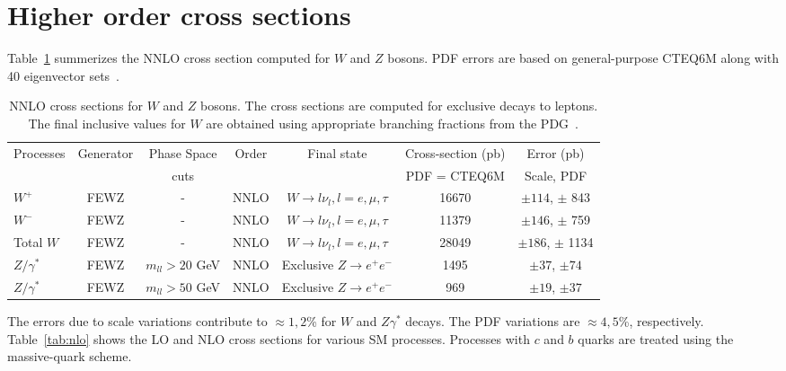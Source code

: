 \section{Higher order cross sections}
\label{sec:results}

Table~\ref{tab:nnlo} summerizes the NNLO cross section computed for $W$ and $Z$ bosons. 
PDF errors are based on general-purpose CTEQ6M along with 40 eigenvector sets~\cite{cteq6m}.

\vspace{3mm}
\begin{table}[hbt]
\begin{center}
\renewcommand{\arraystretch}{1.2}
\begin{tabular}{|l|c|c|c|c|c|c|}\hline
Processes & Generator & Phase Space& Order & Final state & Cross-section (pb)& Error (pb) \\ 
 &  &  cuts & & & PDF = CTEQ6M & Scale, PDF \\ \hline
$W^+$ & FEWZ & - & NNLO & $W \rightarrow l \nu_l, l=e,\mu,\tau$ & 16670 & $\pm 114$, $\pm$ 843 \\ \hline
$W^-$ & FEWZ & - & NNLO & $W \rightarrow l \nu_l, l=e,\mu,\tau$ & 11379 & $\pm 146$, $\pm$ 759 \\ \hline
Total $W$ & FEWZ & - & NNLO & $W \rightarrow l \nu_l, l=e,\mu,\tau$ & 28049 & $\pm 186$, $\pm$ 1134 \\ \hline
$Z/\gamma^*$ & FEWZ & $m_{ll} > 20$ GeV & NNLO & Exclusive $Z \rightarrow e^+e^-$ & 1495 & $\pm 37$, $\pm 74$ \\ \hline
$Z/\gamma^*$ & FEWZ & $m_{ll} > 50$ GeV & NNLO & Exclusive $Z \rightarrow e^+e^-$ & 969 & $\pm 19$, $\pm 37$ \\ \hline
\end{tabular} 
\caption{NNLO cross sections for $W$ and $Z$ bosons. The cross sections are computed for
exclusive decays to leptons. The final inclusive values for $W$ are obtained using appropriate 
branching fractions from the PDG~\cite{pdg}. \label{tab:nnlo}}
\end{center}
\end{table}

The errors due to scale variations contribute to $\approx 1, 2$\% for $W$ 
and $Z\gamma^*$ decays. The PDF variations are $\approx 4, 5$\%, respectively.
Table~\ref{tab:nlo} shows the LO and NLO cross sections for various SM processes.
Processes with $c$ and $b$ quarks are treated using the massive-quark scheme.

